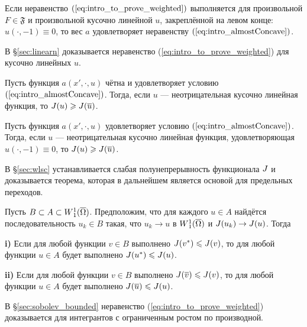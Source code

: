 \begin{thm}
Если неравенство $(\ref{eq:intro_to_prove_weighted})$ выполняется для произвольной $F \in \mathfrak{F}$
и произвольной кусочно линейной $u$, закреплённой на левом конце: $u(\cdot, -1) \equiv 0$,
то вес $a$ удовлетворяет неравенству $(\ref{eq:intro_almostConcave})$.
\end{thm}

В \S\ref{sec:linearn} доказывается неравенство (\ref{eq:intro_to_prove_weighted}) для кусочно линейных $u$.

\begin{lm}
Пусть функция $a(x', \cdot, u)$ чётна и удовлетворяет условию $(\ref{eq:intro_almostConcave})$.
Тогда, если $u$ --- неотрицательная кусочно линейная функция, то $\IWg( u ) \ge \IWg( \mon{u} )$.
\end{lm}

\begin{lm}
Пусть функция $a(x', \cdot, u)$ удовлетворяет условию $(\ref{eq:intro_almostConcave})$.
Тогда, если $u$ --- неотрицательная кусочно линейная функция, удовлетворяющая $u(\cdot, -1) \equiv 0$,
то $\IWg( u ) \ge \IWg( \mon{u} )$.
\end{lm}

В \S\ref{sec:wlsc} устанавливается слабая полунепрерывность функционала $J$
и доказывается теорема, которая в дальнейшем является основой для предельных переходов.

\begin{thm}
Пусть $B \subset A \subset \W(\overline{\Omega})$.
Предположим, что для каждого $u \in A$ найдётся последовательность $u_k \in B$ такая,
что $u_k \to u$ в $\W(\overline{\Omega})$ и $J( u_k ) \to J( u )$.
Тогда

\textbf{\textup{i)}}
Если для любой функции $v \in B$ выполнено $J( {v^*} ) \leqslant J( v )$,
то для любой функции $u \in A$ будет выполнено $J( {u^*} ) \leqslant J( u )$.

\textbf{\textup{ii)}}
Если для любой функции $v \in B$ выполнено $\IWg( \mon{v} ) \le \IWg( v )$,
то для любой функции $u \in A$ будет выполнено $\IWg( \mon{u} ) \le \IWg( u )$.
\end{thm}

В \S\ref{sec:sobolev_bounded} неравенство (\ref{eq:intro_to_prove_weighted}) доказывается для интегрантов с ограниченным ростом по производной.

